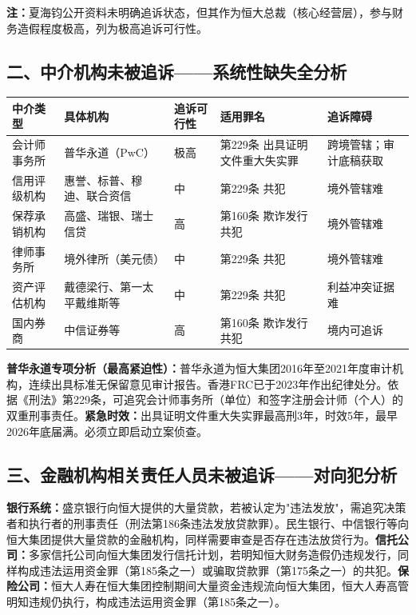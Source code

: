 \documentclass[11pt,a4paper,oneside,openany]{article}
\begin{document}
\textbf{注：}夏海钧公开资料未明确追诉状态，但其作为恒大总裁（核心经营层），参与财务造假程度极高，列为极高追诉可行性。

\subsection{二、中介机构未被追诉——系统性缺失全分析}
\begin{threeparttable}
\caption{中介机构未被追诉系统性缺失分析}
\begin{tabular}{p{2cm}p{2cm}p{1.3cm}p{4.2cm}p{1.8cm}}
\toprule
\textbf{中介类型} & \textbf{具体机构} & \textbf{追诉可行性} & \textbf{适用罪名} & \textbf{追诉障碍} \\
\midrule
会计师事务所 & 普华永道（PwC） & \cellcolor{rowalt}极高 & 第229条 出具证明文件重大失实罪 & 跨境管辖；审计底稿获取 \\
信用评级机构 & 惠誉、标普、穆迪、联合资信 & 中 & 第229条 共犯 & 境外管辖难 \\
保荐承销机构 & 高盛、瑞银、瑞士信贷 & \cellcolor{rowalt}高 & 第160条 欺诈发行共犯 & 境外管辖难 \\
律师事务所 & 境外律所（美元债） & 中 & 第229条 共犯 & 境外管辖难 \\
资产评估机构 & 戴德梁行、第一太平戴维斯等 & 中 & 第229条 共犯 & 利益冲突证据难 \\
国内券商 & 中信证券等 & \cellcolor{rowalt}高 & 第160条 欺诈发行共犯 & 境内可追诉 \\
\bottomrule
\end{tabular}
\end{threeparttable}

\textbf{普华永道专项分析（最高紧迫性）：}普华永道为恒大集团2016年至2021年度审计机构，连续出具标准无保留意见审计报告。香港FRC已于2023年作出纪律处分。依据《刑法》第229条，可追究会计师事务所（单位）和签字注册会计师（个人）的双重刑事责任。\textbf{紧急时效：}出具证明文件重大失实罪最高刑3年，时效5年，最早2026年底届满。必须立即启动立案侦查。

\subsection{三、金融机构相关责任人员未被追诉——对向犯分析}
\textbf{银行系统：}盛京银行向恒大提供的大量贷款，若被认定为"违法发放"，需追究决策者和执行者的刑事责任（刑法第186条违法发放贷款罪）。民生银行、中信银行等向恒大集团提供大量贷款的金融机构，同样需要审查是否存在违法放贷行为。\textbf{信托公司：}多家信托公司向恒大集团发行信托计划，若明知恒大财务造假仍违规发行，同样构成违法运用资金罪（第185条之一）或骗取贷款罪（第175条之一）的共犯。\textbf{保险公司：}恒大人寿在恒大集团控制期间大量资金违规流向恒大集团，恒大人寿高管明知违规仍执行，构成违法运用资金罪（第185条之一）。
\end{document}
